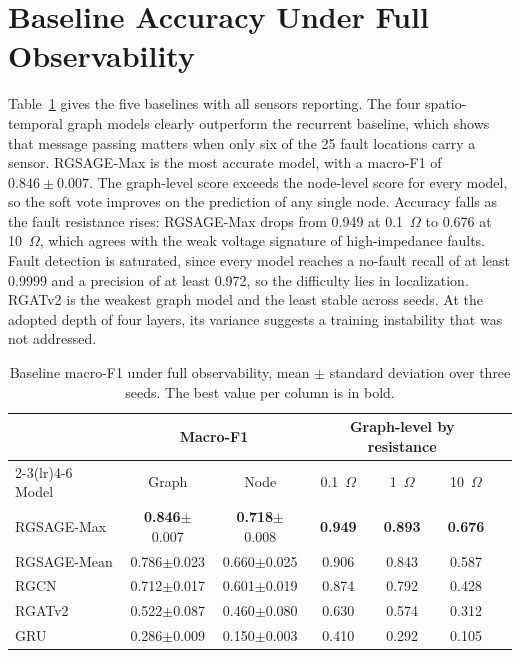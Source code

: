 \documentclass[MTech]{ugthesis}
\begin{document}
\section{Baseline Accuracy Under Full Observability}

Table~\ref{tab:baseline} gives the five baselines with all sensors reporting. The four spatio-temporal graph models clearly outperform the recurrent baseline, which shows that message passing matters when only six of the 25 fault locations carry a sensor. RGSAGE-Max is the most accurate model, with a macro-F1 of $0.846\pm0.007$. The graph-level score exceeds the node-level score for every model, so the soft vote improves on the prediction of any single node. Accuracy falls as the fault resistance rises: RGSAGE-Max drops from 0.949 at 0.1~$\Omega$ to 0.676 at 10~$\Omega$, which agrees with the weak voltage signature of high-impedance faults. Fault detection is saturated, since every model reaches a no-fault recall of at least 0.9999 and a precision of at least 0.972, so the difficulty lies in localization. RGATv2 is the weakest graph model and the least stable across seeds. At the adopted depth of four layers, its variance suggests a training instability that was not addressed.

\begin{table}[htbp]
\caption{Baseline macro-F1 under full observability, mean $\pm$ standard deviation over three seeds. The best value per column is in bold.}
\label{tab:baseline}
\small
\centering
\begin{tabular}{@{}lcccccc@{}}
\toprule
 & \multicolumn{2}{c}{Macro-F1} & \multicolumn{3}{c}{Graph-level by resistance} \\
\cmidrule(lr){2-3}\cmidrule(lr){4-6}
Model & Graph & Node & 0.1~$\Omega$ & 1~$\Omega$ & 10~$\Omega$ \\
\midrule
RGSAGE-Max & \textbf{0.846}$\pm$0.007 & \textbf{0.718}$\pm$0.008 & \textbf{0.949} & \textbf{0.893} & \textbf{0.676} \\
RGSAGE-Mean & 0.786$\pm$0.023 & 0.660$\pm$0.025 & 0.906 & 0.843 & 0.587 \\
RGCN & 0.712$\pm$0.017 & 0.601$\pm$0.019 & 0.874 & 0.792 & 0.428 \\
RGATv2 & 0.522$\pm$0.087 & 0.460$\pm$0.080 & 0.630 & 0.574 & 0.312 \\
GRU & 0.286$\pm$0.009 & 0.150$\pm$0.003 & 0.410 & 0.292 & 0.105 \\
\bottomrule
\end{tabular}
\end{table}
\end{document}
